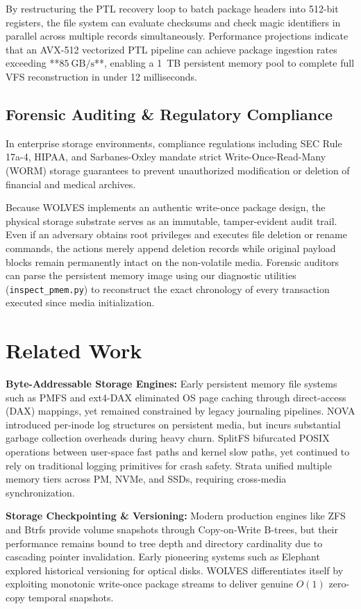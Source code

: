 \documentclass[conference]{IEEEtran}
\begin{document}
By restructuring the PTL recovery loop to batch package headers into 512-bit registers, the file system can evaluate checksums and check magic identifiers in parallel across multiple records simultaneously. Performance projections indicate that an AVX-512 vectorized PTL pipeline can achieve package ingestion rates exceeding **$85~\text{GB/s}$**, enabling a 1~TB persistent memory pool to complete full VFS reconstruction in under 12 milliseconds.

\subsection{Forensic Auditing \& Regulatory Compliance}
In enterprise storage environments, compliance regulations including SEC Rule 17a-4, HIPAA, and Sarbanes-Oxley mandate strict Write-Once-Read-Many (WORM) storage guarantees to prevent unauthorized modification or deletion of financial and medical archives.

Because WOLVES implements an authentic write-once package design, the physical storage substrate serves as an immutable, tamper-evident audit trail. Even if an adversary obtains root privileges and executes file deletion or rename commands, the actions merely append deletion records while original payload blocks remain permanently intact on the non-volatile media. Forensic auditors can parse the persistent memory image using our diagnostic utilities (\texttt{inspect\_pmem.py}) to reconstruct the exact chronology of every transaction executed since media initialization.

\section{Related Work}
\textbf{Byte-Addressable Storage Engines:} Early persistent memory file systems such as PMFS \cite{pmfs} and ext4-DAX eliminated OS page caching through direct-access (DAX) mappings, yet remained constrained by legacy journaling pipelines. NOVA \cite{nova} introduced per-inode log structures on persistent media, but incurs substantial garbage collection overheads during heavy churn. SplitFS \cite{splitfs} bifurcated POSIX operations between user-space fast paths and kernel slow paths, yet continued to rely on traditional logging primitives for crash safety. Strata \cite{strata} unified multiple memory tiers across PM, NVMe, and SSDs, requiring cross-media synchronization.

\textbf{Storage Checkpointing \& Versioning:} Modern production engines like ZFS \cite{zfs} and Btrfs \cite{btrfs} provide volume snapshots through Copy-on-Write B-trees, but their performance remains bound to tree depth and directory cardinality due to cascading pointer invalidation. Early pioneering systems such as Elephant \cite{elephant} explored historical versioning for optical disks. WOLVES differentiates itself by exploiting monotonic write-once package streams to deliver genuine $O(1)$ zero-copy temporal snapshots.
\end{document}
